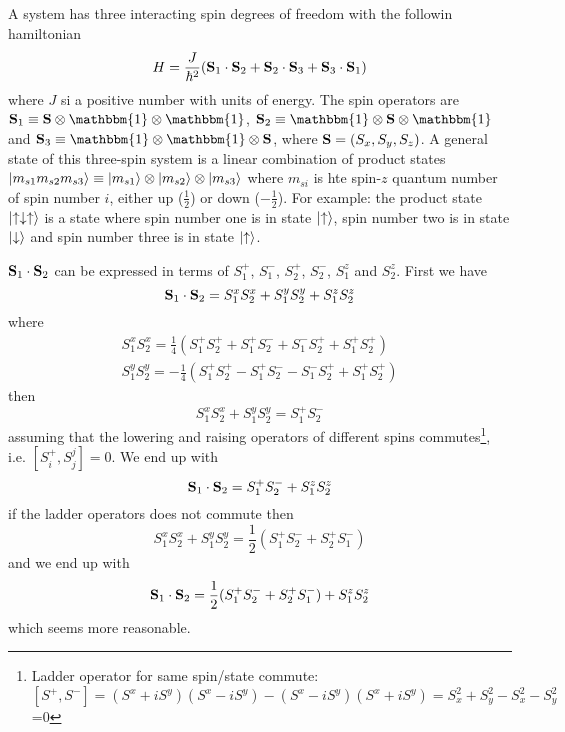\documentclass{article}
\begin{document}
\subsection{}
A system has three interacting spin degrees of freedom with the followin hamiltonian
\begin{equation}
H = \frac{J}{\hbar^2}(\vb{S}_1\cdot\vb{S}_2 + \vb{S}_2\cdot\vb{S}_3 + \vb{S}_3\cdot\vb{S}_1)
\end{equation}
where $J$ si a positive number with units of energy. The spin operators are $\vb{S}_1\equiv \vb{S}\otimes\mathbbm{1}\otimes\mathbbm{1}$, $\vb{S}_2\equiv \mathbbm{1}\otimes\vb{S}\otimes\mathbbm{1}$ and $\vb{S}_3\equiv \mathbbm{1}\otimes\mathbbm{1}\otimes\vb{S}$, where $\vb{S}=(S_x,S_y,S_z)$. A general state of this three-spin system is a linear combination of product states $\ket{m_{s1}m_{s2}m_{s3}}\equiv\ket{m_{s1}}\otimes\ket{m_{s2}}\otimes\ket{m_{s3}}$ where $m_{si}$ is hte spin-$z$ quantum number of spin number $i$, either up ($\frac{1}{2}$) or down ($-\frac{1}{2}$). For example: the product state $\ket{\uparrow\downarrow\uparrow}$ is a state where spin number one is in state $\ket{\uparrow}$, spin number two is in state $\ket{\downarrow}$ and spin number three is in state $\ket{\uparrow}$.

$\vb{S}_1\cdot\vb{S}_2$ can be expressed in terms of $S_1^+$, $S_1^-$, $S_2^+$, $S_2^-$, $S_1^z$ and $S_2^z$. First we have
\begin{equation*}
\vb{S}_1\cdot\vb{S}_2=S_1^xS_2^x + S_1^yS_2^y + S_1^zS_2^z
\end{equation*}
where
\begin{align*}
S_1^xS_2^x= \frac{1}{4}(S_1^+S_2^+ +S_1^+S_2^- + S_1^-S_2^+ + S_1^+S_2^+)\\
S_1^yS_2^y=-\frac{1}{4}(S_1^+S_2^+ -S_1^+S_2^- - S_1^-S_2^+ + S_1^+S_2^+)
\end{align*}
then
\begin{equation*}
S_1^xS_2^x + S_1^yS_2^y = S_1^+S_2^-
\end{equation*}
assuming that the lowering and raising operators of different spins commutes\footnote{Ladder operator for same spin/state commute: $[S^+,S^-]=(S^x+iS^y)(S^x-iS^y)-(S^x-iS^y)(S^x+iS^y)=S_x^2+S_y^2-S_x^2-S_y^2$=0}, i.e. $[S_i^+,S_j^j]=0$. We end up with
\begin{equation}
\vb{S}_1\cdot\vb{S}_2 = S_1^+S_2^- + S_1^zS_2^z
\end{equation}
if the ladder operators does not commute then
\begin{equation*}
S_1^xS_2^x + S_1^yS_2^y = \frac{1}{2}(S_1^+S_2^- + S_2^+S_1^-)
\end{equation*}
and we end up with
\begin{equation}
\vb{S}_1\cdot\vb{S}_2 = \frac{1}{2}(S_1^+S_2^- + S_2^+S_1^-) + S_1^zS_2^z
\end{equation}
which seems more reasonable.
\end{document}
